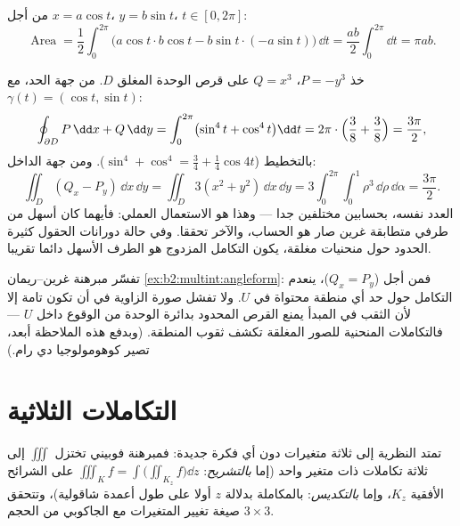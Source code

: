 \begin{example}\label{ex:b2:multint:ellipsearea}
من أجل $x = a\cos t$، $y = b\sin t$، $t \in [0, 2\pi]$:
\[
\operatorname{Area}
= \frac12\int_0^{2\pi}\bigl(a\cos t \cdot b\cos t
- b\sin t\cdot(-a\sin t)\bigr)\,\dd t
= \frac{ab}{2}\int_0^{2\pi}\dd t = \pi ab .
\]
\end{example}

\begin{example}\label{ex:b2:multint:greencheck}
خذ $P = -y^3$، $Q = x^3$ على قرص الوحدة المغلق $D$. من جهة الحد، مع
$\gamma(t) = (\cos t, \sin t)$:
\[
\oint_{\partial D}P\,\dd x + Q\,\dd y
= \int_0^{2\pi}\bigl(\sin^4 t + \cos^4 t\bigr)\dd t
= 2\pi\cdot\Bigl(\frac38 + \frac38\Bigr) = \frac{3\pi}2 ,
\]
بالتخطيط ($\sin^4 + \cos^4 = \tfrac34 +
\tfrac14\cos4t$). ومن جهة الداخل:
\[
\iint_D(Q_x - P_y)\,\dd x\,\dd y
= \iint_D 3(x^2 + y^2)\,\dd x\,\dd y
= 3\int_0^{2\pi}\!\!\int_0^1\rho^3\,\dd\rho\,\dd\alpha
= \frac{3\pi}2 .
\]
العدد نفسه، بحسابين مختلفين جدا --- وهذا هو الاستعمال العملي: فأيهما
كان أسهل من طرفي متطابقة غرين صار هو الحساب، والآخر تحققا. وفي حالة
دورانات الحقول كثيرة الحدود حول منحنيات مغلقة، يكون التكامل المزدوج
هو الطرف الأسهل دائما تقريبا.
\end{example}

\begin{remark}
تفسّر مبرهنة غرين--ريمان \cref{ex:b2:multint:angleform}: فمن أجل  ($Q_x = P_y$)،
ينعدم التكامل حول حد أي منطقة محتواة في $U$. ولا تفشل صورة
الزاوية في أن تكون تامة إلا لأن الثقب في المبدأ يمنع القرص المحدود
بدائرة الوحدة من الوقوع داخل $U$ --- فالتكاملات المنحنية للصور
المغلقة تكشف ثقوب المنطقة. (وبدفع هذه الملاحظة أبعد، تصير كوهومولوجيا
دي رام.)
\end{remark}

\section{التكاملات الثلاثية}

تمتد النظرية إلى ثلاثة متغيرات دون أي فكرة جديدة: فمبرهنة فوبيني
تختزل $\iiint$ إلى ثلاثة تكاملات ذات متغير واحد (إما \emph{بالتشريح}:
$\iiint_K f = \int\bigl(\iint_{K_z}
f\bigr)\dd z$ على الشرائح الأفقية $K_z$، وإما \emph{بالتكديس}: بالمكاملة
بدلالة $z$ أولا على طول أعمدة شاقولية)، وتتحقق صيغة تغيير
المتغيرات مع الجاكوبي من الحجم $3 \times 3$.

